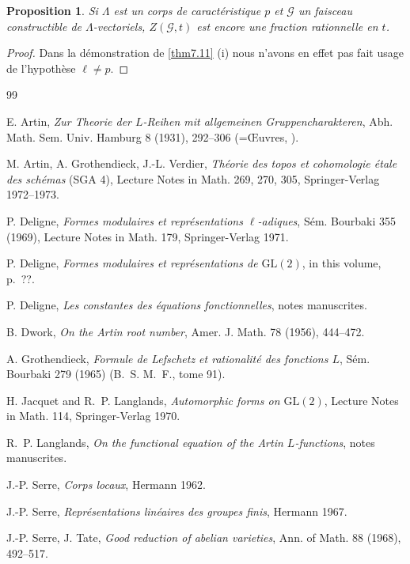 \documentclass[11pt,a4paper]{amsart}
\theoremstyle{plain}
\newtheorem{proposition}[theorem]{Proposition}
\theoremstyle{definition}
\newcommand{\GL}{\mathrm{GL}}
\begin{document}
\begin{proposition}
Si $\Lambda$ est un corps de caract\'eristique $p$ et $\mathscr{G}$ un faisceau constructible de $\Lambda$-vectoriels, $Z(\mathscr{G},t)$ est encore une fraction rationnelle en $t$.
\end{proposition}

\begin{proof}
Dans la d\'emonstration de \ref{thm7.11} (i) nous n'avons en effet pas fait usage de l'hypoth\`ese $\ell \not= p$.
\end{proof}


\begin{thebibliography}{99}

 E. Artin, \textit{Zur Theorie der $L$-Reihen mit allgemeinen Gruppencharakteren}, Abh. Math. Sem. Univ. Hamburg 8 (1931), 292--306 (={\OE}uvres, ).

 M. Artin, A. Grothendieck, J.-L. Verdier, \textit{Th\'eorie des topos et cohomologie \'etale des sch\'emas} (SGA 4), Lecture Notes in Math. 269, 270, 305, Springer-Verlag 1972--1973.

 P. Deligne, \textit{Formes modulaires et repr\'esentations $\ell$-adiques}, S\'em. Bourbaki 355 (1969), Lecture Notes in Math. 179, Springer-Verlag 1971.

 P. Deligne, \textit{Formes modulaires et repr\'esentations de $\GL(2)$}, in this volume, p.~??.

 P. Deligne, \textit{Les constantes des \'equations fonctionnelles}, notes manuscrites.

 B. Dwork, \textit{On the Artin root number}, Amer. J. Math. 78 (1956), 444--472.

 A. Grothendieck, \textit{Formule de Lefschetz et rationalit\'e des fonctions $L$}, S\'em. Bourbaki 279 (1965) (B.~S. M.~F., tome 91).

 H. Jacquet and R.~P. Langlands, \textit{Automorphic forms on $\GL(2)$}, Lecture Notes in Math. 114, Springer-Verlag 1970.

 R.~P. Langlands, \textit{On the functional equation of the Artin $L$-functions}, notes manuscrites.

 J.-P. Serre, \textit{Corps locaux}, Hermann 1962.

 J.-P. Serre, \textit{Repr\'esentations lin\'eaires des groupes finis}, Hermann 1967.

 J.-P. Serre, J. Tate, \textit{Good reduction of abelian varieties}, Ann. of Math. 88 (1968), 492--517.


\end{thebibliography}
\end{document}
